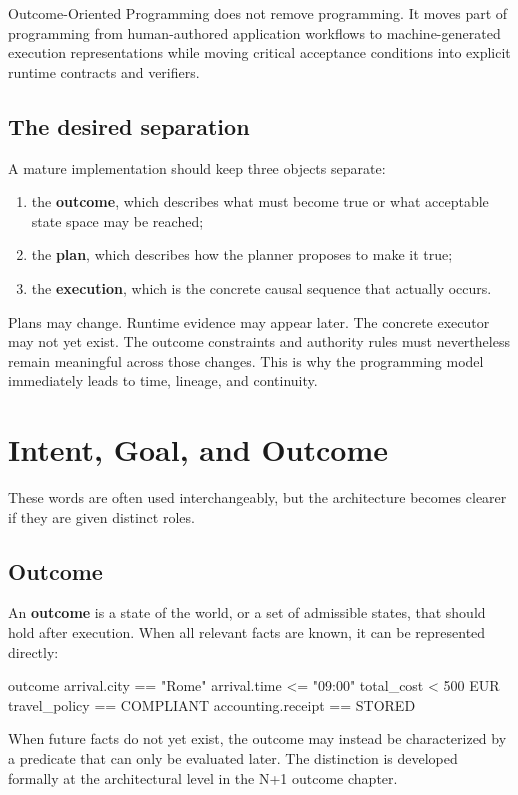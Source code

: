 \documentclass[10pt,oneside,openany]{book}
\newcommand{\term}[1]{\textbf{#1}}
\newcommand{\keyidea}[1]{%
  \vspace{3pt}
  \noindent\fbox{\begin{minipage}{0.94\linewidth}\small\raggedright\textbf{Key idea.} #1\end{minipage}}
  \vspace{3pt}
}
\renewcommand{\keyidea}[1]{\begin{keyideabox}#1\end{keyideabox}}
\begin{document}
\keyidea{Outcome-Oriented Programming does not remove programming. It moves part of programming from human-authored application workflows to machine-generated execution representations while moving critical acceptance conditions into explicit runtime contracts and verifiers.}

\section{The desired separation}
A mature implementation should keep three objects separate:

\begin{enumerate}
\item the \term{outcome}, which describes what must become true or what acceptable state space may be reached;
\item the \term{plan}, which describes how the planner proposes to make it true;
\item the \term{execution}, which is the concrete causal sequence that actually occurs.
\end{enumerate}

Plans may change. Runtime evidence may appear later. The concrete executor may not yet exist. The outcome constraints and authority rules must nevertheless remain meaningful across those changes. This is why the programming model immediately leads to time, lineage, and continuity.

\chapter{Intent, Goal, and Outcome}

These words are often used interchangeably, but the architecture becomes clearer if they are given distinct roles.

\section{Outcome}
An \term{outcome} is a state of the world, or a set of admissible states, that should hold after execution. When all relevant facts are known, it can be represented directly:

\begin{codeblock}
outcome {
  arrival.city == "Rome"
  arrival.time <= "09:00"
  total_cost < 500 EUR
  travel_policy == COMPLIANT
  accounting.receipt == STORED
}
\end{codeblock}

When future facts do not yet exist, the outcome may instead be characterized by a predicate that can only be evaluated later. The distinction is developed formally at the architectural level in the N+1 outcome chapter.
\end{document}
